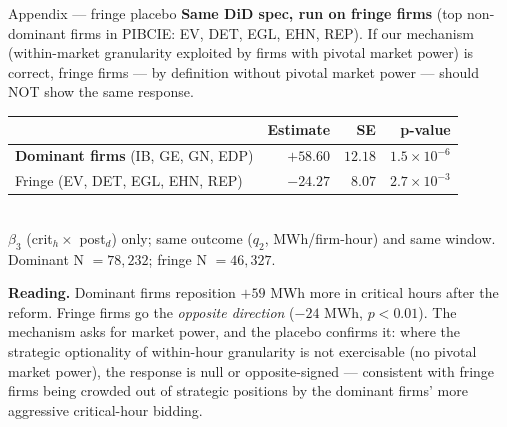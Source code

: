 \documentclass[10pt,aspectratio=169]{beamer}
\begin{document}
\begin{frame}{Appendix --- fringe placebo}
  \footnotesize
  \textbf{Same DiD spec, run on fringe firms} (top non-dominant firms in PIBCIE: EV, DET, EGL, EHN, REP). If our mechanism (within-market granularity exploited by firms with pivotal market power) is correct, fringe firms --- by definition without pivotal market power --- should NOT show the same response.\\[4pt]
  \begin{center}
  \begin{tabular}{lrrr}
    \toprule
                                                  & Estimate          & SE      & p-value \\
    \midrule
    \textbf{Dominant firms} (IB, GE, GN, EDP)     & $\mathbf{+58.60}$ & $12.18$ & $1.5\!\times\!10^{-6}$ \\
    Fringe (EV, DET, EGL, EHN, REP)               & $-24.27$          & $8.07$  & $2.7\!\times\!10^{-3}$ \\
    \bottomrule
  \end{tabular}\\[2pt]
  \footnotesize $\beta_3$ (crit$_h \times$ post$_d$) only; same outcome ($q_2$, MWh/firm-hour) and same window. Dominant N $= 78{,}232$; fringe N $= 46{,}327$.
  \end{center}
  \textbf{Reading.} Dominant firms reposition $+59$ MWh more in critical hours after the reform. Fringe firms go the \emph{opposite direction} ($-24$ MWh, $p < 0.01$). The mechanism asks for market power, and the placebo confirms it: where the strategic optionality of within-hour granularity is not exercisable (no pivotal market power), the response is null or opposite-signed --- consistent with fringe firms being crowded out of strategic positions by the dominant firms' more aggressive critical-hour bidding.
\end{frame}
\end{document}
